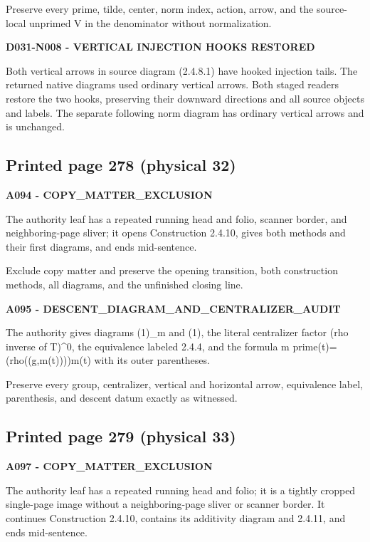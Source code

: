 \documentclass[10pt,a4paper]{article}
\begin{document}
Preserve every prime, tilde, center, norm index, action, arrow, and the source-local unprimed V in the denominator without normalization.

\textbf{D031-N008 - VERTICAL INJECTION HOOKS RESTORED}

Both vertical arrows in source diagram (2.4.8.1) have hooked injection tails. The returned native diagrams used ordinary vertical arrows. Both staged readers restore the two hooks, preserving their downward directions and all source objects and labels. The separate following norm diagram has ordinary vertical arrows and is unchanged.

\subsection{Printed page 278 (physical 32)}

\textbf{A094 - COPY\_MATTER\_EXCLUSION}

The authority leaf has a repeated running head and folio, scanner border, and neighboring-page sliver; it opens Construction 2.4.10, gives both methods and their first diagrams, and ends mid-sentence.

Exclude copy matter and preserve the opening transition, both construction methods, all diagrams, and the unfinished closing line.

\textbf{A095 - DESCENT\_DIAGRAM\_AND\_CENTRALIZER\_AUDIT}

The authority gives diagrams (1)\_m and (1), the literal centralizer factor (rho inverse of T)\^{}0, the equivalence labeled 2.4.4, and the formula m prime(t)=(rho((g,m(t))))m(t) with its outer parentheses.

Preserve every group, centralizer, vertical and horizontal arrow, equivalence label, parenthesis, and descent datum exactly as witnessed.

\subsection{Printed page 279 (physical 33)}

\textbf{A097 - COPY\_MATTER\_EXCLUSION}

The authority leaf has a repeated running head and folio; it is a tightly cropped single-page image without a neighboring-page sliver or scanner border. It continues Construction 2.4.10, contains its additivity diagram and 2.4.11, and ends mid-sentence.
\end{document}
